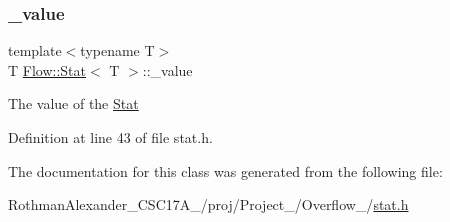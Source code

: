 \subsubsection{\texorpdfstring{\+\_\+value}{\_value}}
{\footnotesize\ttfamily template$<$typename T$>$ \\
T \hyperlink{class_flow_1_1_stat}{Flow\+::\+Stat}$<$ T $>$\+::\+\_\+value\hspace{0.3cm}{\ttfamily [protected]}}

The value of the \hyperlink{class_flow_1_1_stat}{Stat} 

Definition at line 43 of file stat.\+h.



The documentation for this class was generated from the following file\+:\begin{DoxyCompactItemize}
\item 
Rothman\+Alexander\+\_\+\+C\+S\+C17\+A\+\_/proj/\+Project\+\_/\+Overflow\+\_/\hyperlink{stat_8h}{stat.\+h}\end{DoxyCompactItemize}

